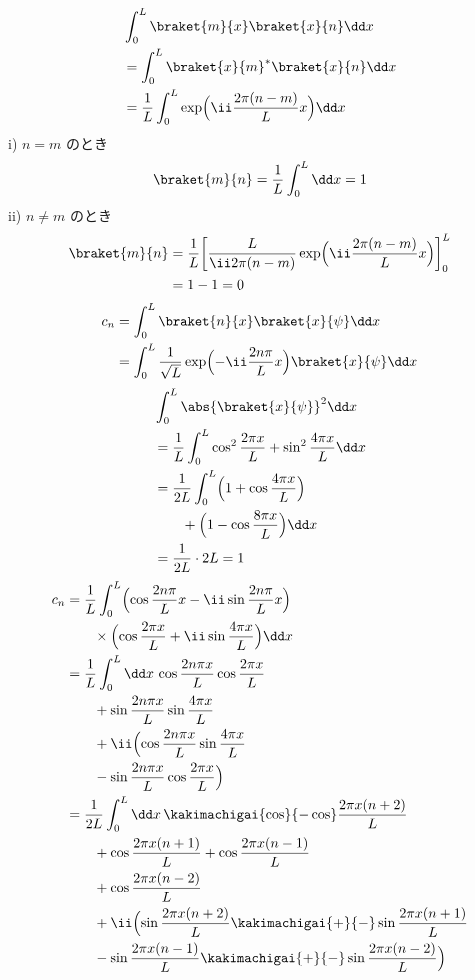 \begin{align*}
&\int_{0}^{L}\braket{m}{x}\braket{x}{n}\dd x\\
&=\int_{0}^{L}\braket{x}{m}^{*}\braket{x}{n}\dd x\\
&=\frac{1}{L}\int_{0}^{L}\exp\Bigl(\ii\frac{2\pi(n-m)}{L}x\Bigr)\dd x
\end{align*}
i) $n=m$ のとき
\[ \braket{m}{n}=\frac{1}{L}\int_{0}^{L}\dd x=1 \]
ii) $n\neq m$ のとき
\begin{align*}
\braket{m}{n}&=\frac{1}{L}\biggl[\frac{L}{\ii2\pi(n-m)}\exp\Bigl(\ii\frac{2\pi(n-m)}{L}x\Bigr)\biggr]_{0}^{L}\\
&=1-1=0
\end{align*}
\begin{align*}
c_{n}&=\int_{0}^{L}\braket{n}{x}\braket{x}{\psi}\dd x\\
&=\int_{0}^{L}\frac{1}{\sqrt{L}}\exp\Bigl(-\ii\frac{2n\pi}{L}x\Bigr)\braket{x}{\psi}\dd x
\end{align*}
\begin{align*}
&\int_{0}^{L}\abs{\braket{x}{\psi}}^{2}\dd x\\
&=\frac{1}{L}\int_{0}^{L}\cos^{2}\frac{2\pi x}{L}+\sin^{2}\frac{4\pi x}{L}\dd x\\
&=\frac{1}{2L}\int_{0}^{L}\Bigl(1+\cos\frac{4\pi x}{L}\Bigr)\\
&\qquad+\Bigl(1-\cos\frac{8\pi x}{L}\Bigr)\dd x\\
&=\frac{1}{2L}\cdot2L=1
\end{align*}
\begin{align*}
c_{n}&=\frac{1}{L}\int_{0}^{L}\Bigl(\cos\frac{2n\pi}{L}x-\ii\sin\frac{2n\pi}{L}x\Bigr)\\
&\qquad\times\Bigl(\cos\frac{2\pi x}{L}+\ii\sin\frac{4\pi x}{L}\Bigr)\dd x\\
&=\frac{1}{L}\int_{0}^{L}\dd x\,\cos\frac{2n\pi x}{L}\cos\frac{2\pi x}{L}\\
&\qquad+\sin\frac{2n\pi x}{L}\sin\frac{4\pi x}{L}\\
&\qquad+\ii\Bigl(\cos\frac{2n\pi x}{L}\sin\frac{4\pi x}{L}\\
&\qquad-\sin\frac{2n\pi x}{L}\cos\frac{2\pi x}{L}\Bigr)\\
&=\frac{1}{2L}\int_{0}^{L}\dd x\,\kakimachigai{\cos}{-\cos}\frac{2\pi x(n+2)}{L}\\
&\qquad+\cos\frac{2\pi x(n+1)}{L}+\cos\frac{2\pi x(n-1)}{L}\\
&\qquad+\cos\frac{2\pi x(n-2)}{L}\\
&\qquad+\ii\Bigl(\sin\frac{2\pi x(n+2)}{L}\kakimachigai{+}{-}\sin\frac{2\pi x(n+1)}{L}\\
&\qquad-\sin\frac{2\pi x(n-1)}{L}\kakimachigai{+}{-}\sin\frac{2\pi x(n-2)}{L}\Bigr)
\end{align*}
